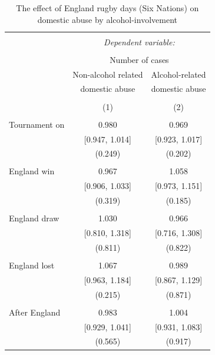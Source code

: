 \documentclass[12pt, a4paper]{article}
\begin{document}



\begin{table}[!htbp] \centering 
  \begin{threeparttable}
  \caption{The effect of England rugby days (Six Nations) on domestic abuse by alcohol-involvement} 
  \label{rugby} 
\begin{tabular}{@{\extracolsep{5pt}}lcc} 
\\[-1.8ex]\hline 
\hline \\[-1.8ex] 
 & \multicolumn{2}{c}{\textit{Dependent variable:}} \\ 
\cline{2-3} 
\\[-1.8ex] & \multicolumn{2}{c}{Number of cases} \\ 
 & Non-alcohol related & Alcohol-related\\ 
 & domestic abuse & domestic abuse\\
\\[-1.8ex] & (1) & (2)\\ 
\hline \\[-1.8ex] 
Tournament on & 0.980 & 0.969 \\ 
  & [0.947, 1.014] & [0.923, 1.017] \\ 
  & (0.249) & (0.202) \\ 
  & & \\ 
 England win & 0.967 & 1.058 \\ 
  & [0.906, 1.033] & [0.973, 1.151] \\ 
  & (0.319) & (0.185) \\ 
  & & \\ 
 England draw & 1.030 & 0.966 \\ 
  & [0.810, 1.318] & [0.716, 1.308] \\ 
  & (0.811) & (0.822) \\ 
  & & \\ 
 England lost & 1.067 & 0.989 \\ 
  & [0.963, 1.184] & [0.867, 1.129] \\ 
  & (0.215) & (0.871) \\ 
  & & \\ 
 After England & 0.983 & 1.004 \\ 
  & [0.929, 1.041] & [0.931, 1.083] \\ 
  & (0.565) & (0.917) \\ 



\end{tabular}
\end{threeparttable}
\end{table}
\end{document}
